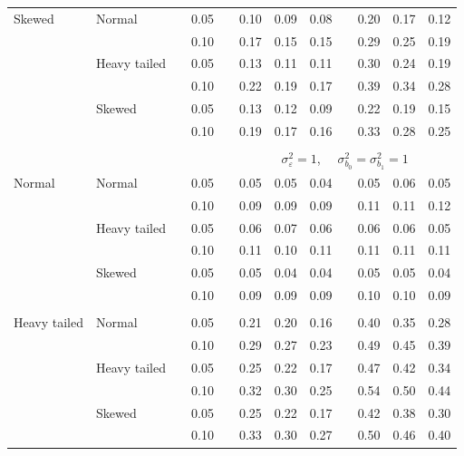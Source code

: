 \documentclass[12pt]{article} %
\begin{document}
\begin{table}[ht]
\begin{scriptsize}
\begin{center}
\begin{tabular}{ll p{.1cm} c p{.1cm} rrr p{.1cm} rrr}
Skewed       & Normal       && 0.05 &&   0.10 & 0.09 & 0.08 && 0.20 & 0.17 & 0.12 \\ 
             &              && 0.10 &&   0.17 & 0.15 & 0.15 && 0.29 & 0.25 & 0.19 \\ 
             & Heavy tailed && 0.05 &&   0.13 & 0.11 & 0.11 && 0.30 & 0.24 & 0.19 \\ 
             &              && 0.10 &&   0.22 & 0.19 & 0.17 && 0.39 & 0.34 & 0.28 \\ 
             & Skewed       && 0.05 &&   0.13 & 0.12 & 0.09 && 0.22 & 0.19 & 0.15 \\ 
             &              && 0.10 &&   0.19 & 0.17 & 0.16 && 0.33 & 0.28 & 0.25 \\ 

&&&&&&&&&&&\\
& && && \multicolumn{7}{c}{$\sigma_{\varepsilon}^2 = 1$, \ \ $\sigma_{b_0}^2 = \sigma_{b_1}^2 = 1$} \\ \cline{6-12}
\rowcolor{gray!20}Normal       & Normal       && 0.05 &&   0.05 & 0.05 & 0.04 && 0.05 & 0.06 & 0.05 \\ 
\rowcolor{gray!20}             &              && 0.10 &&   0.09 & 0.09 & 0.09 && 0.11 & 0.11 & 0.12 \\ 
\rowcolor{gray!20}             & Heavy tailed && 0.05 &&   0.06 & 0.07 & 0.06 && 0.06 & 0.06 & 0.05 \\ 
\rowcolor{gray!20}             &              && 0.10 &&   0.11 & 0.10 & 0.11 && 0.11 & 0.11 & 0.11 \\ 
\rowcolor{gray!20}             & Skewed       && 0.05 &&   0.05 & 0.04 & 0.04 && 0.05 & 0.05 & 0.04 \\ 
\rowcolor{gray!20}             &              && 0.10 &&   0.09 & 0.09 & 0.09 && 0.10 & 0.10 & 0.09 \\ 
             &&&&&&&&&&&\\
Heavy tailed & Normal       && 0.05 &&   0.21 & 0.20 & 0.16 && 0.40 & 0.35 & 0.28 \\ 
             &              && 0.10 &&   0.29 & 0.27 & 0.23 && 0.49 & 0.45 & 0.39 \\ 
             & Heavy tailed && 0.05 &&   0.25 & 0.22 & 0.17 && 0.47 & 0.42 & 0.34 \\ 
             &              && 0.10 &&   0.32 & 0.30 & 0.25 && 0.54 & 0.50 & 0.44 \\ 
             & Skewed       && 0.05 &&   0.25 & 0.22 & 0.17 && 0.42 & 0.38 & 0.30 \\ 
             &              && 0.10 &&   0.33 & 0.30 & 0.27 && 0.50 & 0.46 & 0.40 \\ 

\end{tabular}
\end{center}
\end{scriptsize}
\end{table}
\end{document}
